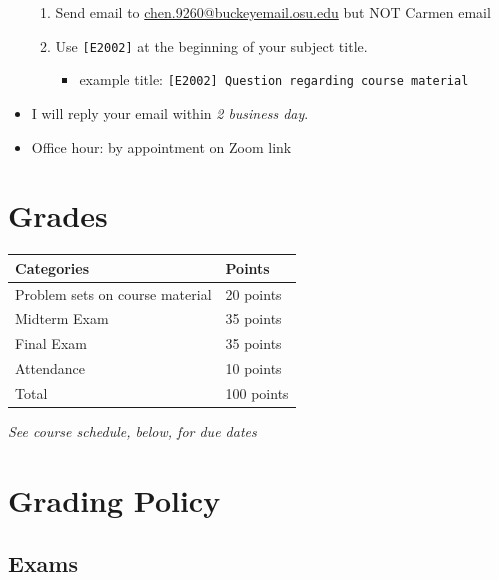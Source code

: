 \documentclass[12pt]{article}
\begin{document}
\begin{itemize}
\begin{enumerate}
        \item Send email to \href{chen.9260@buckeyemail.osu.edu}{chen.9260@buckeyemail.osu.edu} but NOT Carmen email
        \item Use \texttt{[E2002]} at the beginning of your subject title.
        \begin{itemize}
            \item example title: \texttt{[E2002] Question regarding course material}
        \end{itemize}
    \end{enumerate}
    \item I will reply your email within \textit{2 business day}.
    \item Office hour: by appointment on Zoom link
\end{itemize}

\newpage

\section*{Grades}


\newlength\q
\setlength{}
\newlength\y
\setlength{}
\begin{center}
\begin{tabular}{|p{\q}|p{\q}|}
    \hline
    Categories  & Points \\
    \hline
    \hline
    Problem sets on course material   & 20 points \\
    \hline
    Midterm Exam & 35 points \\
    \hline
    Final Exam & 35 points \\
    \hline
    Attendance & 10 points \\
    \hline
    Total & 100 points \\
    \hline
\end{tabular}
\end{center}

\textit{See course schedule, below, for due dates}


\section*{Grading Policy}


\subsection*{Exams}
\end{document}
